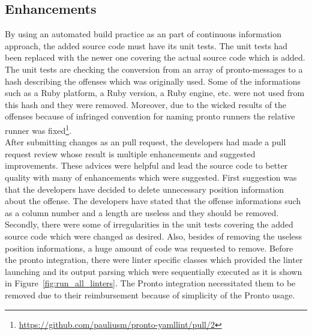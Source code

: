 \subsection{Enhancements}

By using an automated build practice as an part of continuous information approach, the added source code must have its unit tests. The unit tests had been replaced with the newer one covering the actual source code which is added. The unit tests are checking the conversion from an array of pronto-messages to a hash describing the offenses which was originally used. Some of the informations such as a Ruby platform, a Ruby version, a Ruby engine, etc. were not used from this hash and they were removed. Moreover, due to the wicked results of the offenses because of infringed convention for naming pronto runners the relative runner was fixed\footnote{\url{https://github.com/pauliusm/pronto-yamllint/pull/2}}.\\

After submitting changes as an pull request, the developers had made a pull request review whose result is multiple enhancements and suggested improvements. These advices were helpful and lead the source code to better quality with many of enhancements which were suggested. First suggestion was that the developers have decided to delete unnecessary position information about the offense. The developers have stated that the offense informations such as a column number and a length are useless and they should be removed. Secondly, there were some of irregularities in the unit tests covering the added source code which were changed as desired. Also, besides of removing the useless position informations, a huge amount of code was requested to remove. Before the pronto integration, there were linter specific classes which provided the linter launching and its output parsing which were sequentially executed as it is shown in Figure~\ref{fig:run_all_linters}. The Pronto integration necessitated them to be removed due to their reimbursement because of simplicity of the Pronto usage.\\

